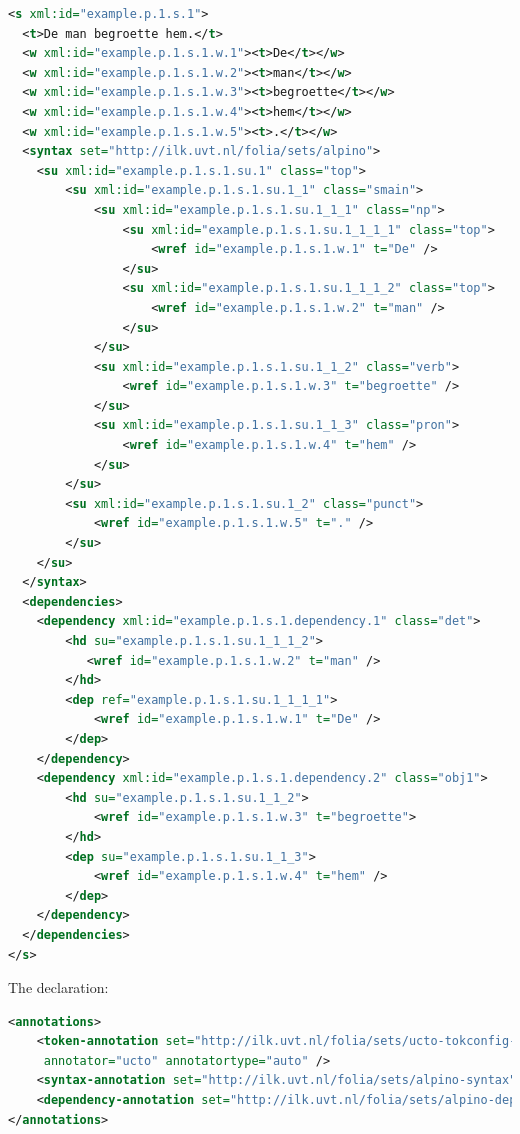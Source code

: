 \documentclass[a4paper,12pt]{report}
\begin{document}
\begin{lstlisting}[language=xml]
<s xml:id="example.p.1.s.1">
  <t>De man begroette hem.</t>
  <w xml:id="example.p.1.s.1.w.1"><t>De</t></w>
  <w xml:id="example.p.1.s.1.w.2"><t>man</t></w>
  <w xml:id="example.p.1.s.1.w.3"><t>begroette</t></w>
  <w xml:id="example.p.1.s.1.w.4"><t>hem</t></w>
  <w xml:id="example.p.1.s.1.w.5"><t>.</t></w>
  <syntax set="http://ilk.uvt.nl/folia/sets/alpino">
    <su xml:id="example.p.1.s.1.su.1" class="top">     
        <su xml:id="example.p.1.s.1.su.1_1" class="smain">     
            <su xml:id="example.p.1.s.1.su.1_1_1" class="np">     
                <su xml:id="example.p.1.s.1.su.1_1_1_1" class="top">     
                    <wref id="example.p.1.s.1.w.1" t="De" />       
                </su>
                <su xml:id="example.p.1.s.1.su.1_1_1_2" class="top">     
                    <wref id="example.p.1.s.1.w.2" t="man" />
                </su> 
            </su>
            <su xml:id="example.p.1.s.1.su.1_1_2" class="verb">     
                <wref id="example.p.1.s.1.w.3" t="begroette" />   
            </su>
            <su xml:id="example.p.1.s.1.su.1_1_3" class="pron">     
                <wref id="example.p.1.s.1.w.4" t="hem" />   
            </su>
        </su>
        <su xml:id="example.p.1.s.1.su.1_2" class="punct">
            <wref id="example.p.1.s.1.w.5" t="." />               
        </su> 
    </su>
  </syntax>
  <dependencies>
    <dependency xml:id="example.p.1.s.1.dependency.1" class="det">
        <hd su="example.p.1.s.1.su.1_1_1_2">
           <wref id="example.p.1.s.1.w.2" t="man" />   
        </hd>
        <dep ref="example.p.1.s.1.su.1_1_1_1">
            <wref id="example.p.1.s.1.w.1" t="De" />   
        </dep>
    </dependency>
    <dependency xml:id="example.p.1.s.1.dependency.2" class="obj1">
        <hd su="example.p.1.s.1.su.1_1_2">
            <wref id="example.p.1.s.1.w.3" t="begroette">
        </hd>
        <dep su="example.p.1.s.1.su.1_1_3">
            <wref id="example.p.1.s.1.w.4" t="hem" />   
        </dep>
    </dependency>
  </dependencies>
</s>
\end{lstlisting}

The declaration:

\begin{lstlisting}[language=xml]
<annotations>
    <token-annotation set="http://ilk.uvt.nl/folia/sets/ucto-tokconfig-nl" 
     annotator="ucto" annotatortype="auto" />
    <syntax-annotation set="http://ilk.uvt.nl/folia/sets/alpino-syntax" /> 
    <dependency-annotation set="http://ilk.uvt.nl/folia/sets/alpino-dep" />
</annotations>
\end{lstlisting}
\end{document}

